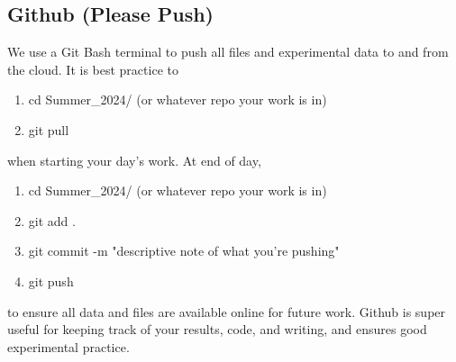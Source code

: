 \documentclass{paper}[11pt]
\begin{document}
\subsection{Github (Please Push)}
We use a Git Bash terminal to push all files and experimental data to and from the cloud. It is best practice to 
\begin{enumerate}
    \item cd Summer\_2024/ (or whatever repo your work is in)
    \item git pull
\end{enumerate}
when starting your day's work. At end of day,
\begin{enumerate}
    \item cd Summer\_2024/ (or whatever repo your work is in)
    \item git add .
    \item git commit -m "descriptive note of what you're pushing"
    \item git push
\end{enumerate}
to ensure all data and files are available online for future work. Github is super useful for keeping track of your results, code, and writing, and ensures good experimental practice. 
\end{document}
